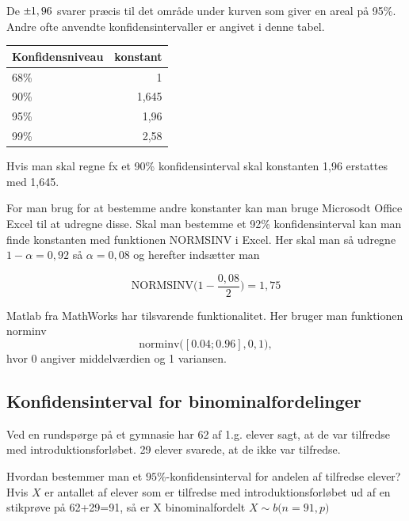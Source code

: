 De \(\plusminus 1,96\) svarer præcis til det område under kurven som giver en areal
på 95\%. Andre ofte anvendte konfidensintervaller er angivet i denne tabel.

\begin{table}[]
\centering
\begin{tabular}{@{}|l|r|@{}}
\toprule
Konfidensniveau & \multicolumn{1}{l|}{konstant} \\ \midrule
68\%            & 1                             \\ \midrule
90\%            & 1,645                         \\ \midrule
95\%            & 1,96                          \\ \midrule
99\%            & 2,58                          \\ \bottomrule
\end{tabular}
\end{table}

Hvis man skal regne fx et 90\% konfidensinterval skal konstanten 1,96 erstattes med
1,645.

For man brug for at bestemme andre konstanter kan man bruge Microsodt Office Excel
til at udregne disse. Skal man bestemme et 92\% konfidensinterval kan man finde
konstanten med funktionen NORMSINV i Excel. Her skal man så udregne
\(1-\alpha = 0,92\) så \(\alpha = 0,08\) og herefter indsætter man

\begin{equation}
  \mbox{NORMSINV} \Big( 1-\frac{0,08}{2} \Big) = 1,75
\end{equation}

Matlab fra MathWorks har tilsvarende funktionalitet. Her bruger man funktionen
norminv
\begin{equation}
  \mbox{norminv}\big([0.04; 0.96], 0, 1\big),
\end{equation}
hvor 0 angiver middelværdien og 1 variansen.

\subsection{Konfidensinterval for binominalfordelinger}
Ved en rundspørge på et gymnasie har 62 af 1.g. elever sagt, at de var tilfredse
med introduktionsforløbet. 29 elever svarede, at de ikke var tilfredse.

Hvordan bestemmer man et \(95\%\)-konfidens\-interval for andelen af tilfredse
elever? Hvis \(X\) er antallet af elever som er tilfredse med introduktionsforløbet
ud af en stikprøve på 62+29=91, så er X binominalfordelt
\(X \sim b\big(n=91,p \big)\)


